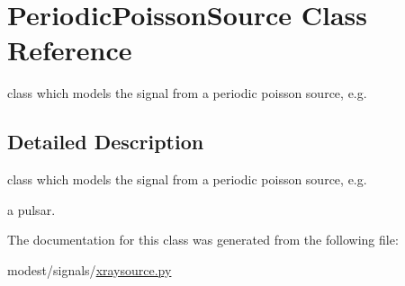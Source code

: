 \hypertarget{classPeriodicPoissonSource}{}\section{Periodic\+Poisson\+Source Class Reference}
\label{classPeriodicPoissonSource}


class which models the signal from a periodic poisson source, e.\+g.  




\subsection{Detailed Description}
class which models the signal from a periodic poisson source, e.\+g. 

a pulsar. 

The documentation for this class was generated from the following file\+:\begin{DoxyCompactItemize}
\item 
modest/signals/\hyperlink{xraysource_8py}{xraysource.\+py}\end{DoxyCompactItemize}
